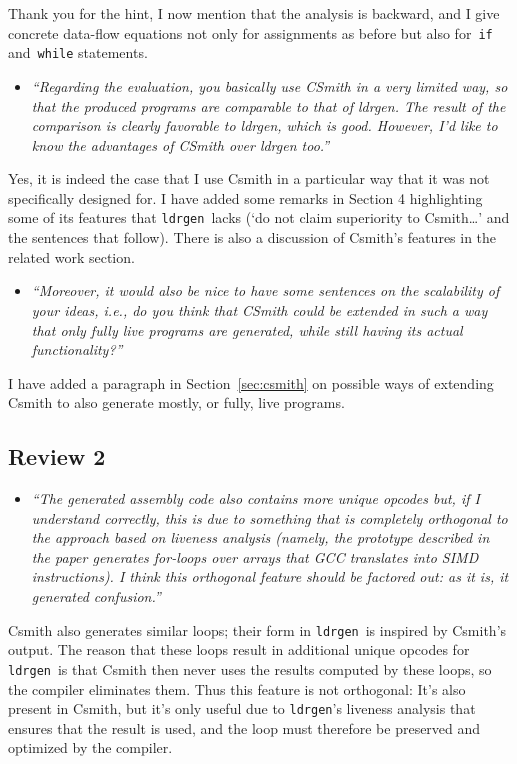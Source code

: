 \documentclass{llncs}
\newcommand\ldrgen{\texttt{ldrgen}}
\begin{document}
Thank you for the hint, I now mention that the analysis is backward, and I
give concrete data-flow equations not only for assignments as before but
also for~\texttt{if} and~\texttt{while} statements.

\begin{itemize}\item
\emph{``Regarding the evaluation, you basically use CSmith in a very limited
way, so that the produced programs are comparable to that of ldrgen.
The result of the comparison is clearly favorable to ldrgen, which is
good. However, I'd like to know the advantages of CSmith over ldrgen
too.''}
\end{itemize}

Yes, it is indeed the case that I use Csmith in a particular way that it was
not specifically designed for. I have added some remarks in Section 4
highlighting some of its features that \ldrgen\ lacks (`do not claim
superiority to Csmith\dots' and the sentences that follow). There is also a
discussion of Csmith's features in the related work section.

\begin{itemize}\item
\emph{``Moreover, it would also be nice to have some sentences on the
scalability of your ideas, i.e., do you think that CSmith could be
extended in such a way that only fully live programs are generated,
while still having its actual functionality?''}
\end{itemize}

I have added a paragraph in Section~\ref{sec:csmith} on possible ways of
extending Csmith to also generate mostly, or fully, live programs.


\subsection{Review 2}

\begin{itemize}\item
\emph{``The generated assembly code also
contains more unique opcodes but, if I understand correctly, this
is due to something that is completely orthogonal to the approach
based on liveness analysis (namely, the prototype described in the
paper generates for-loops over arrays that GCC translates into
SIMD instructions).  I think this orthogonal feature should be
factored out: as it is, it generated confusion.''}
\end{itemize}

Csmith also generates similar loops; their form in \ldrgen\ is inspired by
Csmith's output. The reason that these loops result in additional unique
opcodes for \ldrgen\ is that Csmith then never uses the results computed by
these loops, so the compiler eliminates them. Thus this feature is not
orthogonal: It's also present in Csmith, but it's only useful due to
\ldrgen's liveness analysis that ensures that the result is used, and the
loop must therefore be preserved and optimized by the compiler.
\end{document}

